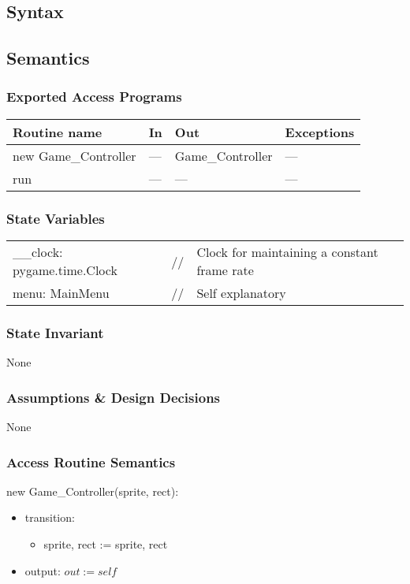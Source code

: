 \documentclass[12pt]{article}
\begin{document}
\subsection* {Syntax}

\subsection* {Semantics}

\subsubsection* {Exported Access Programs}

\begin{tabular}{| l | l | l | l |}
\hline
\textbf{Routine name} & \textbf{In} & \textbf{Out} & \textbf{Exceptions}\\
\hline
new Game\_Controller & --- & Game\_Controller & ---\\
\hline
run & --- & --- & ---\\
\hline
\end{tabular}

\subsubsection* {State Variables}
\begin{tabular}{lll}
\_\_clock: pygame.time.Clock & // & Clock for maintaining a constant frame rate\\
menu: MainMenu & // & Self explanatory\\
\end{tabular}

\subsubsection* {State Invariant}

None

\subsubsection* {Assumptions \& Design Decisions}

None

\subsubsection* {Access Routine Semantics}

new Game\_Controller(sprite, rect):
\begin{itemize}
    \item transition: 
    \begin{itemize}[]
        \item sprite, rect := sprite, rect
    \end{itemize}
    \item output: $out := self$
\end{itemize}
\end{document}
